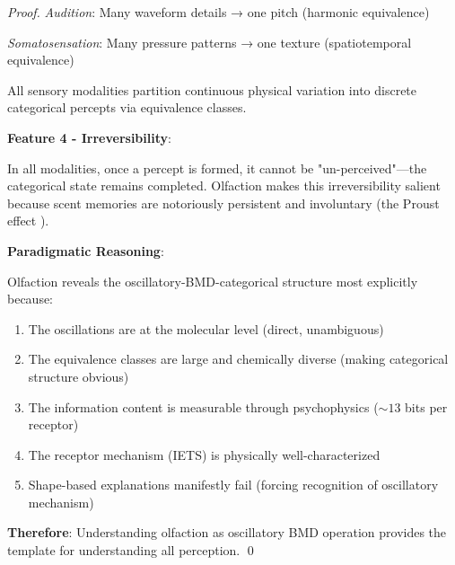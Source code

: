 \begin{proof}
\textit{Audition}: Many waveform details → one pitch (harmonic equivalence)

\textit{Somatosensation}: Many pressure patterns → one texture (spatiotemporal equivalence)

All sensory modalities partition continuous physical variation into discrete categorical percepts via equivalence classes.

\textbf{Feature 4 - Irreversibility}:

In all modalities, once a percept is formed, it cannot be "un-perceived"—the categorical state remains completed. Olfaction makes this irreversibility salient because scent memories are notoriously persistent and involuntary (the Proust effect \cite{chu2003proust}).

\textbf{Paradigmatic Reasoning}:

Olfaction reveals the oscillatory-BMD-categorical structure most explicitly because:
\begin{enumerate}
\item The oscillations are at the molecular level (direct, unambiguous)
\item The equivalence classes are large and chemically diverse (making categorical structure obvious)
\item The information content is measurable through psychophysics ($\sim 13$ bits per receptor)
\item The receptor mechanism (IETS) is physically well-characterized
\item Shape-based explanations manifestly fail (forcing recognition of oscillatory mechanism)
\end{enumerate}

\textbf{Therefore}: Understanding olfaction as oscillatory BMD operation provides the template for understanding all perception. \qed
\end{proof}

